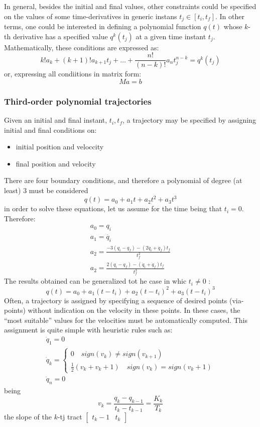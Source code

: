 \documentclass{book}
\begin{document}
In general, besides the initial and final values, other constraints could be specified on the values of some time-derivatives in generic instans $t_j\in[t_i,t_f]$. In other terms, one could be interested in defining a polynomial function $q(t)$ whose $k$-th derivative has a specified value $q^k(t_j)$ at a given time instant $t_j$. Mathematically, these conditions are expressed as: 
\[
    k!a_k+(k+1)!a_{k+1}t_j+\dots+\displaystyle\frac{n!}{(n-k)!}a_nt_j^{n-k}=q^k(t_j)
\]
or, expressing all condiitions in matrix form: 
\[
    Ma=b
\]

\subsubsection{Third-order polynomial trajectories}
Given an initial and final instant, $t_i,t_f$, a trajectory may be specified by assigning initial and final conditions on: 
\begin{itemize}
    \item initial position and veloccity 
        \item final position and velocity 
\end{itemize}
There are four boundary conditions, and therefore a polynomial of degree (at least) 3 must be considered
\[
    q(t)=a_0+a_1t+a_2t^2+a_3t^3
\]
in order to solve these equations, let us assume for the time being that $t_i=0$. Therefore: 
\begin{gather*}
    a_0=q_i \\
    a_1  = \dot{q_i}\\
    a_2 = \displaystyle\frac{-3(q_i-q_f)-(2\dot{q}_i+\dot{q}_f)t_f}{t_f^2}\\
    a_2 = \displaystyle\frac{2(q_i-q_f)-(\dot{q}_i+\dot{q}_f)t_f}{t_f^3}
\end{gather*}
The results obtained can be generalized tot he case in whic $t_i\neq0$ :
\[
    q(t)=a_0+a_1(t-t_i)+a_2(t-t_i)^2+a_3(t-t_i)^3
\]
Often, a trajectory is assigned by specifying a sequence of desired points (via-points)
without indication on the velocity in these points.
In these cases, the “most suitable” values for the velocities must be automatically
computed.
This assignment is quite simple with heuristic rules such as:
\begin{gather*}
    \dot{q}_1 = 0\\
    \dot{q}_k= \begin{cases}
        0 \quad sign(v_k)\neq sign(v_{k+1})\\
        \displaystyle\frac{1}{2}(v_k+v_k+1) \quad sign(v_k)=sign(v_k+1)
    \end{cases}\\
    \dot{q}_n=0
\end{gather*}
being 
\[
    v_k = \displaystyle\frac{q_k-q_{k-1}}{t_k-t_{k-1}}=\displaystyle\frac{K_k}{T_k}
\]
the slope of the $k$-tj tract $\begin{bmatrix}
    t_k-1 & t_k
\end{bmatrix}$
\end{document}
